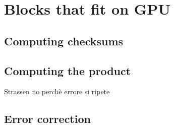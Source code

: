 \section{Blocks that fit on GPU}
\subsection{Computing checksums}
\subsection{Computing the product}
Strassen no perchè errore si ripete
\subsection{Error correction}
